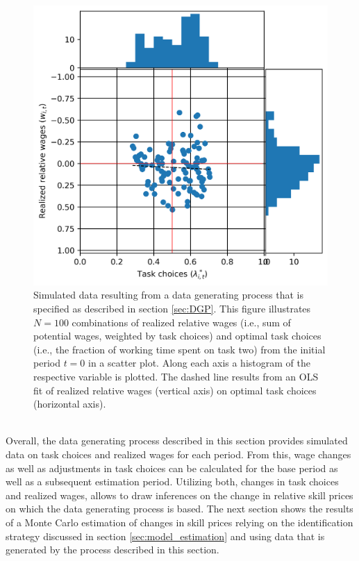 \documentclass[../main.tex]{subfiles}
\begin{document}
\begin{figure}[!htbp]
	\centering
	\includegraphics[scale=0.7]{./FIG/simulated_data.png} 
	\caption{Simulated data resulting from a data generating process that is specified as described in section \ref{sec:DGP}. This figure illustrates $N=100$ combinations of realized relative wages (i.e., sum of potential wages, weighted by task choices) and optimal task choices (i.e., the fraction of working time spent on task two) from the initial period $t=0$ in a scatter plot. Along each axis a histogram of the respective variable is plotted. The dashed line results from an OLS fit of realized relative wages (vertical axis) on optimal task choices (horizontal axis).}
	\label{fig:simulated_data}
\end{figure}
\\
Overall, the data generating process described in this section provides simulated data on task choices and realized wages for each period. From this, wage changes as well as adjustments in task choices can be calculated for the base period as well as a subsequent estimation period. Utilizing both, changes in task choices and realized wages, allows to draw inferences on the change in relative skill prices on which the data generating process is based. The next section shows the results of a Monte Carlo estimation of changes in skill prices relying on the identification strategy discussed in section \ref{sec:model_estimation} and using data that is generated by the process described in this section.
\end{document}
